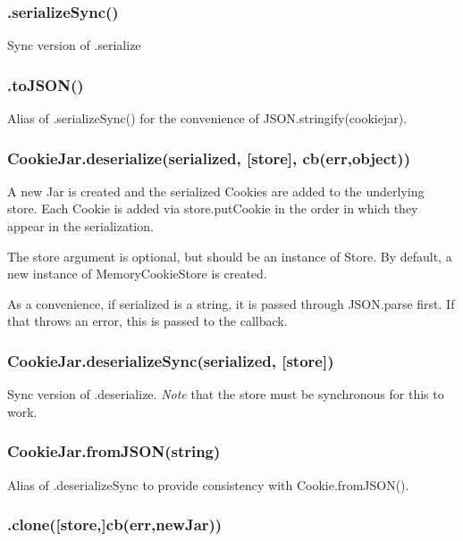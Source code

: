\subsubsection*{{\ttfamily .serialize\+Sync()}}

Sync version of .serialize

\subsubsection*{{\ttfamily .to\+J\+S\+O\+N()}}

Alias of .serialize\+Sync() for the convenience of {\ttfamily J\+S\+O\+N.\+stringify(cookiejar)}.

\subsubsection*{{\ttfamily Cookie\+Jar.\+deserialize(serialized, \mbox{[}store\mbox{]}, cb(err,object))}}

A new Jar is created and the serialized Cookies are added to the underlying store. Each {\ttfamily Cookie} is added via {\ttfamily store.\+put\+Cookie} in the order in which they appear in the serialization.

The {\ttfamily store} argument is optional, but should be an instance of {\ttfamily Store}. By default, a new instance of {\ttfamily Memory\+Cookie\+Store} is created.

As a convenience, if {\ttfamily serialized} is a string, it is passed through {\ttfamily J\+S\+O\+N.\+parse} first. If that throws an error, this is passed to the callback.

\subsubsection*{{\ttfamily Cookie\+Jar.\+deserialize\+Sync(serialized, \mbox{[}store\mbox{]})}}

Sync version of {\ttfamily .deserialize}. {\itshape Note} that the {\ttfamily store} must be synchronous for this to work.

\subsubsection*{{\ttfamily Cookie\+Jar.\+from\+J\+S\+O\+N(string)}}

Alias of {\ttfamily .deserialize\+Sync} to provide consistency with {\ttfamily Cookie.\+from\+J\+S\+O\+N()}.

\subsubsection*{{\ttfamily .clone(\mbox{[}store,\mbox{]}cb(err,new\+Jar))}}

